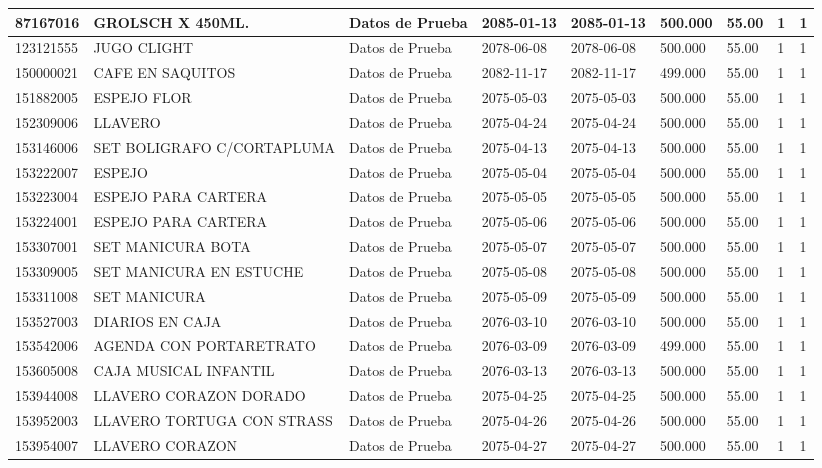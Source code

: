 \documentclass[a4paper,12pt]{article}
\begin{document}
\begin{landscape}
\begin{longtable}{|p{4cm}|p{2.5cm}|p{2.5cm}|p{1.8cm}|p{1.8cm}|p{1cm}|p{1cm}|p{3cm}|p{3cm}||}
87167016 & GROLSCH   X 450ML. & Datos de Prueba & 2085-01-13 & 2085-01-13 & 500.000 & 55.00 & 1 & 1 \\ \hline 
123121555 & JUGO CLIGHT & Datos de Prueba & 2078-06-08 & 2078-06-08 & 500.000 & 55.00 & 1 & 1 \\ \hline 
150000021 & CAFE EN SAQUITOS & Datos de Prueba & 2082-11-17 & 2082-11-17 & 499.000 & 55.00 & 1 & 1 \\ \hline 
151882005 & ESPEJO FLOR & Datos de Prueba & 2075-05-03 & 2075-05-03 & 500.000 & 55.00 & 1 & 1 \\ \hline 
152309006 & LLAVERO & Datos de Prueba & 2075-04-24 & 2075-04-24 & 500.000 & 55.00 & 1 & 1 \\ \hline 
153146006 & SET BOLIGRAFO C/CORTAPLUMA & Datos de Prueba & 2075-04-13 & 2075-04-13 & 500.000 & 55.00 & 1 & 1 \\ \hline 
153222007 & ESPEJO & Datos de Prueba & 2075-05-04 & 2075-05-04 & 500.000 & 55.00 & 1 & 1 \\ \hline 
153223004 & ESPEJO PARA CARTERA & Datos de Prueba & 2075-05-05 & 2075-05-05 & 500.000 & 55.00 & 1 & 1 \\ \hline 
153224001 & ESPEJO PARA CARTERA & Datos de Prueba & 2075-05-06 & 2075-05-06 & 500.000 & 55.00 & 1 & 1 \\ \hline 
153307001 & SET MANICURA BOTA & Datos de Prueba & 2075-05-07 & 2075-05-07 & 500.000 & 55.00 & 1 & 1 \\ \hline 
153309005 & SET MANICURA EN ESTUCHE & Datos de Prueba & 2075-05-08 & 2075-05-08 & 500.000 & 55.00 & 1 & 1 \\ \hline 
153311008 & SET MANICURA & Datos de Prueba & 2075-05-09 & 2075-05-09 & 500.000 & 55.00 & 1 & 1 \\ \hline 
153527003 & DIARIOS EN CAJA & Datos de Prueba & 2076-03-10 & 2076-03-10 & 500.000 & 55.00 & 1 & 1 \\ \hline 
153542006 & AGENDA CON PORTARETRATO & Datos de Prueba & 2076-03-09 & 2076-03-09 & 499.000 & 55.00 & 1 & 1 \\ \hline 
153605008 & CAJA MUSICAL INFANTIL & Datos de Prueba & 2076-03-13 & 2076-03-13 & 500.000 & 55.00 & 1 & 1 \\ \hline 
153944008 & LLAVERO CORAZON DORADO & Datos de Prueba & 2075-04-25 & 2075-04-25 & 500.000 & 55.00 & 1 & 1 \\ \hline 
153952003 & LLAVERO TORTUGA CON STRASS & Datos de Prueba & 2075-04-26 & 2075-04-26 & 500.000 & 55.00 & 1 & 1 \\ \hline 
153954007 & LLAVERO CORAZON & Datos de Prueba & 2075-04-27 & 2075-04-27 & 500.000 & 55.00 & 1 & 1 \\ \hline 

\end{longtable}
\end{landscape}
\end{document}
